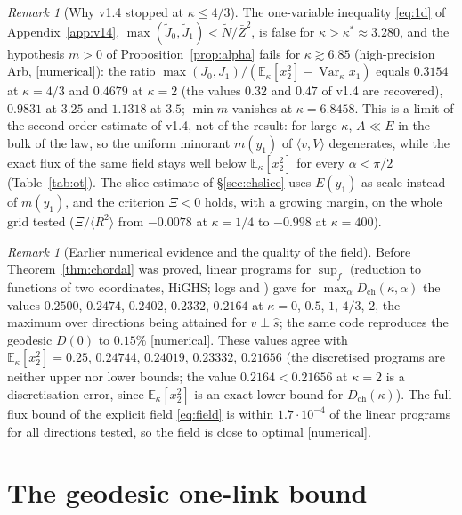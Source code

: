 \documentclass[11pt,a4paper]{article}
\theoremstyle{remark}
\newtheorem{remark}[theorem]{Remark}
\theoremstyle{definition}
\theoremstyle{plain}
\theoremstyle{remark}
\newcommand{\E}{\mathbb{E}}
\newcommand{\Var}{\operatorname{Var}}
\newcommand{\st}[1]{\textsf{[#1]}}
\newcommand{\Zb}{\bar Z}
\newcommand{\Dch}{D_{\mathrm{ch}}}
\begin{document}
\begin{remark}[Why v1.4 stopped at $\kappa\le4/3$]\label{rem:limit14}
The one-variable inequality \eqref{eq:1d} of Appendix~\ref{app:v14}, $\max(\tilde J_0,\tilde J_1)<\tilde N/\Zb^2$, is false for $\kappa>\kappa^*\approx3.280$, and the hypothesis $m>0$
of Proposition~\ref{prop:alpha} fails for $\kappa\gtrsim6.85$ (high-precision Arb, \st{numerical}): the ratio $\max(J_0,J_1)/(\E_\kappa[x_2^2]-\Var_\kappa x_1)$ equals $0.3154$ at $\kappa=4/3$ and $0.4679$ at $\kappa=2$
(the values $0.32$ and $0.47$ of v1.4 are recovered), $0.9831$ at $3.25$ and $1.1318$ at $3.5$; $\min m$ vanishes at $\kappa=6.8458$. This is a limit of the second-order estimate of v1.4, not of the result: for large $\kappa$,
$A\ll E$ in the bulk of the law, so the uniform minorant $m(y_1)$ of $\langle v,V\rangle$ degenerates, while the exact flux of the same field stays well below $\E_\kappa[x_2^2]$ for every $\alpha<\pi/2$ (Table~\ref{tab:ot}).
The slice estimate of \S\ref{sec:chslice} uses $E(y_1)$ as scale instead of $m(y_1)$, and the criterion $\Xi<0$ holds, with a growing margin, on the whole grid tested ($\Xi/\langle R^2\rangle$ from $-0.0078$ at $\kappa=1/4$ to $-0.998$ at $\kappa=400$).
\end{remark}

\begin{remark}[Earlier numerical evidence and the quality of the field]\label{rem:chordal}
Before Theorem~\ref{thm:chordal} was proved, linear programs for $\sup_f$ (reduction to functions of two
coordinates, HiGHS; logs  and ) gave for
$\max_\alpha\Dch(\kappa,\alpha)$ the values $0.2500$, $0.2474$, $0.2402$, $0.2332$, $0.2164$ at $\kappa=0$, $0.5$, $1$,
$4/3$, $2$,
the maximum over directions being attained for $v\perp\hat s$; the same code reproduces the geodesic $D(0)$ to
$0.15\%$ \st{numerical}. These values agree with $\E_\kappa[x_2^2]=0.25,\,0.24744,\,0.24019,\,0.23332,\,0.21656$ (the
discretised programs are neither upper nor lower bounds; the value $0.2164<0.21656$ at $\kappa=2$ is a
discretisation error, since $\E_\kappa[x_2^2]$ is an exact lower bound for $\Dch(\kappa)$). The full flux bound of
the explicit field \eqref{eq:field} is within $1.7\cdot10^{-4}$ of the linear programs for all directions tested,
so the field is close to optimal \st{numerical}.
\end{remark}

\section{The geodesic one-link bound}\label{sec:onelink}
\end{document}
